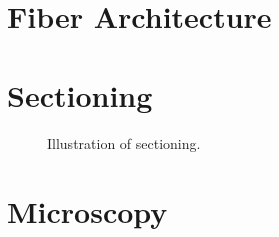 \section{Fiber Architecture}
%
\section{Sectioning}
%
\begin{figure}[!tb]
	\centering
	\caption{Illustration of sectioning.}
	\label{fig::brain_sectioning}
\end{figure}
%
\section{Microscopy}